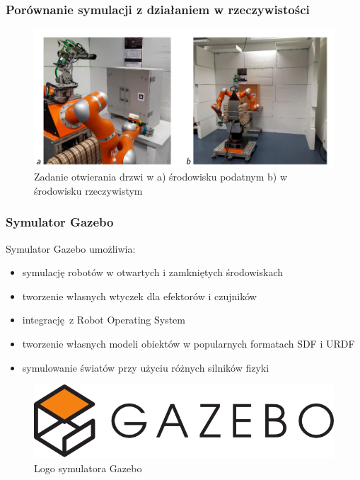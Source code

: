 
\begin{frame}
\frametitle{Porównanie symulacji z działaniem w rzeczywistości}
\begin{figure}
	\includegraphics[scale=0.35]{./images/otwieranie_real.png}
	\caption{Zadanie otwierania drzwi w a) środowisku podatnym b) w środowisku rzeczywistym}
	\end{figure}
\end{frame}


\begin{frame}
	\frametitle{Symulator Gazebo}
	Symulator Gazebo umożliwia:
	\begin{itemize}
		\item symulację robotów w otwartych i zamkniętych środowiskach
		\item tworzenie własnych wtyczek dla efektorów i czujników 
		\item integrację z Robot Operating System
		\item tworzenie własnych modeli obiektów w popularnych formatach SDF i URDF
		\item symulowanie światów przy użyciu różnych silników fizyki 
	\end{itemize}
	\bigskip \medskip
	\begin{figure}
		\includegraphics[scale=0.3]{./images/gazebo.png}
		\caption{\normalsize{Logo symulatora Gazebo}}
	\end{figure}
\end{frame}

